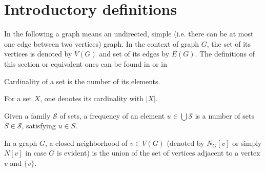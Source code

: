 \section{Introductory definitions}
In the following a graph means an undirected, simple (i.e. there can be at most one edge between two vertices) graph. In the context of graph $G$, the set of its vertices is denoted by $V(G)$ and set of its edges by $E(G)$. The definitions of this section or equivalent ones can be found in \cite{bollobas1998modern} or in \cite{DBLP:journals/eatcs/FominGK05}
\begin{definition}[cardinality]
Cardinality of a set is the number of its elements.
\end{definition}
For a set $X$, one denotes its cardinality with $|X|$.
\begin{definition}[frequency]
Given a family $\mathcal{S}$ of sets, a frequency of an element $u \in \bigcup \mathcal{S}$ is a number of sets $S \in \mathcal{S}$, satisfying $u\in S$.
\end{definition}
\begin{definition}
In a graph $G$, a closed neighborhood of $v \in V(G)$ (denoted by $N_G[v]$ or simply $N[v]$ in case $G$ is evident) is the union of the set of vertices adjacent to a vertex $v$ and $\{v\}$.
\end{definition}

